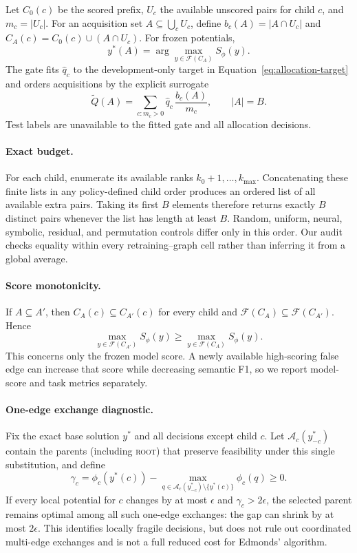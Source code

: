 \documentclass[11pt]{article}
\newcommand{\rootnode}{\textsc{root}}
\begin{document}
Let $C_0(c)$ be the scored prefix, $U_c$ the available unscored pairs for
child $c$, and $m_c=|U_c|$. For an acquisition set
$A\subseteq\bigcup_c U_c$, define $b_c(A)=|A\cap U_c|$ and
$C_A(c)=C_0(c)\cup(A\cap U_c)$. For frozen potentials,
\begin{equation}
 y^*(A)=\arg\max_{y\in\mathcal F(C_A)} S_\phi(y).
 \label{eq:acquisition-decode}
\end{equation}
The gate fits $\widehat q_c$ to the development-only target in
Equation~\ref{eq:allocation-target} and orders acquisitions by the explicit
surrogate
\begin{equation}
 \widetilde Q(A)=\sum_{c:m_c>0}\widehat q_c\,\frac{b_c(A)}{m_c},
 \qquad |A|=B.
 \label{eq:acquisition}
\end{equation}
Test labels are unavailable to the fitted gate and all allocation decisions.

\paragraph{Exact budget.}
For each child, enumerate its available ranks $k_0+1,\ldots,k_{\max}$.
Concatenating these finite lists in any policy-defined child order produces an
ordered list of all available extra pairs. Taking its first $B$ elements
therefore returns exactly $B$ distinct pairs whenever the list has length at
least $B$. Random, uniform, neural, symbolic, residual, and permutation
controls differ only in this order. Our audit checks equality within every
retraining--graph cell rather than inferring it from a global average.

\paragraph{Score monotonicity.}
If $A\subseteq A'$, then $C_A(c)\subseteq C_{A'}(c)$ for every child and
$\mathcal F(C_A)\subseteq\mathcal F(C_{A'})$. Hence
\[
 \max_{y\in\mathcal F(C_{A'})}S_\phi(y)
 \geq \max_{y\in\mathcal F(C_A)}S_\phi(y).
\]
This concerns only the frozen model score. A newly available high-scoring
false edge can increase that score while decreasing semantic F1, so we report
model-score and task metrics separately.

\paragraph{One-edge exchange diagnostic.}
Fix the exact base solution $y^*$ and all decisions except child $c$. Let
$\mathcal A_c(y^*_{-c})$ contain the parents (including \rootnode{}) that
preserve feasibility under this single substitution, and define
\[
 \gamma_c=\phi_c(y^*(c))-\max_{q\in\mathcal A_c(y^*_{-c})
 \setminus\{y^*(c)\}}\phi_c(q)\geq0.
\]
If every local potential for $c$ changes by at most $\epsilon$ and
$\gamma_c>2\epsilon$, the selected parent remains optimal among all such
one-edge exchanges: the gap can shrink by at most $2\epsilon$. This identifies
locally fragile decisions, but does not rule out coordinated multi-edge
exchanges and is not a full reduced cost for Edmonds' algorithm.
\end{document}

